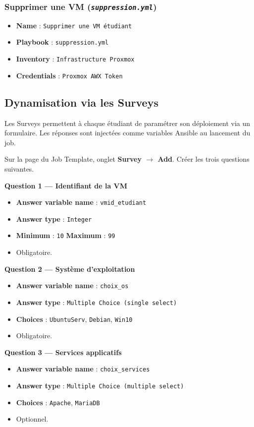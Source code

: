 \documentclass[a4paper]{article}
\newcommand{\cmd}[1]{\texttt{#1}}
\newcommand{\file}[1]{\texttt{\textit{#1}}}
\begin{document}
\subsubsection*{Supprimer une VM (\file{suppression.yml})}

\begin{itemize}
  \item \textbf{Name} : \cmd{Supprimer une VM étudiant}
  \item \textbf{Playbook} : \cmd{suppression.yml}
  \item \textbf{Inventory} : \cmd{Infrastructure Proxmox}
  \item \textbf{Credentials} : \cmd{Proxmox AWX Token}
\end{itemize}

\subsection{Dynamisation via les Surveys}

Les Surveys permettent à chaque étudiant de paramétrer son déploiement via un formulaire. Les réponses sont injectées comme variables Ansible au lancement du job.

Sur la page du Job Template, onglet \textbf{Survey \(\to\) Add}. Créer les trois questions suivantes.

\medskip
\textbf{Question 1 --- Identifiant de la VM}
\begin{itemize}
  \item \textbf{Answer variable name} : \cmd{vmid\_etudiant}
  \item \textbf{Answer type} : \cmd{Integer}
  \item \textbf{Minimum} : \cmd{10} \quad \textbf{Maximum} : \cmd{99}
  \item Obligatoire.
\end{itemize}

\medskip
\textbf{Question 2 --- Système d'exploitation}
\begin{itemize}
  \item \textbf{Answer variable name} : \cmd{choix\_os}
  \item \textbf{Answer type} : \cmd{Multiple Choice (single select)}
  \item \textbf{Choices} : \cmd{UbuntuServ}, \cmd{Debian}, \cmd{Win10}
  \item Obligatoire.
\end{itemize}

\medskip
\textbf{Question 3 --- Services applicatifs}
\begin{itemize}
  \item \textbf{Answer variable name} : \cmd{choix\_services}
  \item \textbf{Answer type} : \cmd{Multiple Choice (multiple select)}
  \item \textbf{Choices} : \cmd{Apache}, \cmd{MariaDB}
  \item Optionnel.
\end{itemize}
\end{document}
